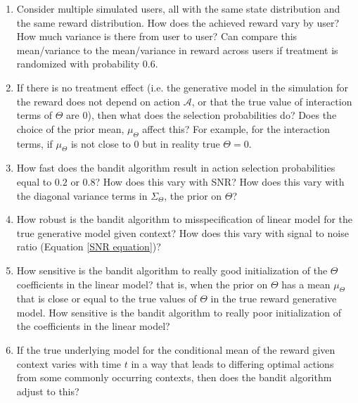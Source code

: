 \begin{enumerate}
	\item Consider multiple simulated users, all with the same state distribution and the same reward distribution.  How does the achieved reward vary by user?  How much variance is there from user to user?
		\subitem Can compare this mean/variance to the mean/variance in reward across users if treatment is randomized with probability $0.6$.


	\item If there is no treatment effect (i.e. the generative model in the simulation for the reward does not depend on action $\mathcal{A}$, or that the true value of interaction terms of $\Theta$ are $0$), then what does the selection probabilities do?  Does the choice of the prior mean, $\mu_\Theta$ affect this?  For example, for the interaction terms, if $\mu_\Theta$ is not close to $0$ but in reality true $\Theta = 0$.
	
	\item How fast does the bandit algorithm result in action selection probabilities equal to $0.2$ or $0.8$?  How does this vary with SNR?  How does this vary with the diagonal variance terms in $\Sigma_\Theta$, the prior on $\Theta$?

	\item How robust is the bandit algorithm to misspecification of linear model for the true generative model given context?  How does this vary with signal to noise ratio (Equation \ref{SNR equation})?


	\item How sensitive is the bandit algorithm to really good initialization of the $\Theta$ coefficients in the linear model?  that is, when the prior on $\Theta$ has a mean $\mu_\Theta$ that is close or equal to the true values of $\Theta$ in the true reward generative model.  How sensitive is the bandit algorithm to really poor initialization of the coefficients in the linear model?
	\item If the true underlying model for the conditional mean of the reward given context varies with time $t$ in a way that leads to differing optimal actions from some commonly occurring contexts, then does the bandit algorithm adjust to this?
\end{enumerate}

